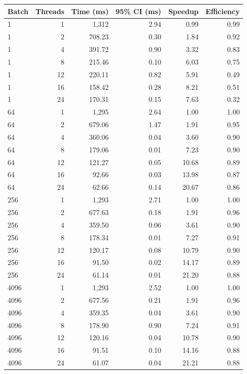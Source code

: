 \begin{tabular}{lrrrrr}
\toprule
Batch & Threads & Time (ms) & 95\% CI (ms) & Speedup & Efficiency \\
\midrule
1 & 1 & 1,312 & 2.94 & 0.99 & 0.99 \\
1 & 2 & 708.23 & 0.30 & 1.84 & 0.92 \\
1 & 4 & 391.72 & 0.90 & 3.32 & 0.83 \\
1 & 8 & 215.46 & 0.10 & 6.03 & 0.75 \\
1 & 12 & 220.11 & 0.82 & 5.91 & 0.49 \\
1 & 16 & 158.42 & 0.28 & 8.21 & 0.51 \\
1 & 24 & 170.31 & 0.15 & 7.63 & 0.32 \\
64 & 1 & 1,295 & 2.64 & 1.00 & 1.00 \\
64 & 2 & 679.06 & 1.47 & 1.91 & 0.95 \\
64 & 4 & 360.06 & 0.04 & 3.60 & 0.90 \\
64 & 8 & 179.06 & 0.01 & 7.23 & 0.90 \\
64 & 12 & 121.27 & 0.05 & 10.68 & 0.89 \\
64 & 16 & 92.66 & 0.03 & 13.98 & 0.87 \\
64 & 24 & 62.66 & 0.14 & 20.67 & 0.86 \\
256 & 1 & 1,293 & 2.71 & 1.00 & 1.00 \\
256 & 2 & 677.63 & 0.18 & 1.91 & 0.96 \\
256 & 4 & 359.50 & 0.06 & 3.61 & 0.90 \\
256 & 8 & 178.34 & 0.01 & 7.27 & 0.91 \\
256 & 12 & 120.17 & 0.08 & 10.79 & 0.90 \\
256 & 16 & 91.50 & 0.02 & 14.17 & 0.89 \\
256 & 24 & 61.14 & 0.01 & 21.20 & 0.88 \\
4096 & 1 & 1,293 & 2.52 & 1.00 & 1.00 \\
4096 & 2 & 677.56 & 0.21 & 1.91 & 0.96 \\
4096 & 4 & 359.35 & 0.04 & 3.61 & 0.90 \\
4096 & 8 & 178.90 & 0.90 & 7.24 & 0.91 \\
4096 & 12 & 120.16 & 0.04 & 10.78 & 0.90 \\
4096 & 16 & 91.51 & 0.10 & 14.16 & 0.88 \\
4096 & 24 & 61.07 & 0.04 & 21.21 & 0.88 \\
\bottomrule
\end{tabular}
